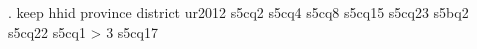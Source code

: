 . keep hhid province district ur2012 s5cq2 s5cq4 s5cq8 s5cq15 s5cq23 s5bq2 s5cq22 s5cq1
> 3 s5cq17 
{\smallskip}
